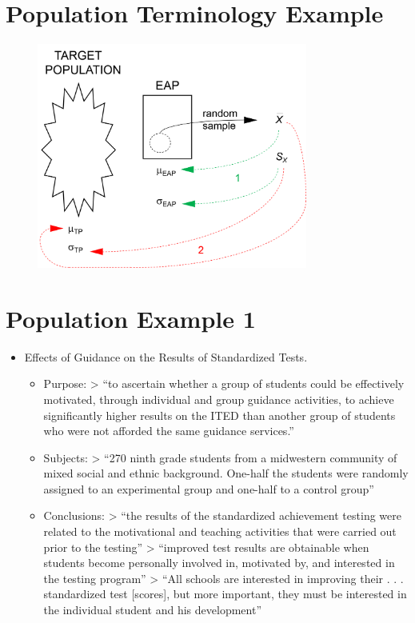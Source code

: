\documentclass[12pt]{article}
\begin{document}
\section{Population Terminology
Example}\label{population-terminology-example}

\begin{figure}[H]
\centering
\includegraphics[width=3.5in]{infer_population.png}
\caption{}
\end{figure}

\section{Population Example 1}\label{population-example-1}

\begin{itemize}
\itemsep1pt\parskip0pt
\item
  Effects of Guidance on the Results of Standardized Tests.

  \begin{itemize}
  \item
    Purpose: \textgreater{} ``to ascertain whether a group of students
    could be effectively motivated, through individual and group
    guidance activities, to achieve significantly higher results on the
    ITED than another group of students who were not afforded the same
    guidance services.''
  \item
    Subjects: \textgreater{} ``270 ninth grade students from a
    midwestern community of mixed social and ethnic background. One-half
    the students were randomly assigned to an experimental group and
    one-half to a control group''
  \item
    Conclusions: \textgreater{} ``the results of the standardized
    achievement testing were related to the motivational and teaching
    activities that were carried out prior to the testing''
    \textgreater{} ``improved test results are obtainable when students
    become personally involved in, motivated by, and interested in the
    testing program'' \textgreater{} ``All schools are interested in
    improving their . . . standardized test {[}scores{]}, but more
    important, they must be interested in the individual student and his
    development''
  \end{itemize}
\end{itemize}
\end{document}
